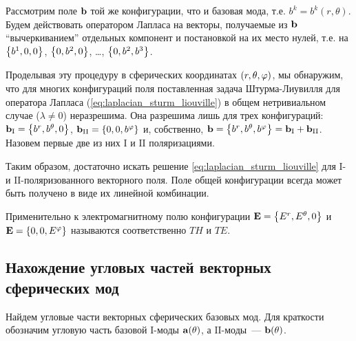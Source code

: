 \documentclass[12pt,a4paper]{article}
\begin{document}
            Рассмотрим поле $\vb{b}$ той же конфигурации, что и базовая мода, т.е. $b^k = b^k(r,\theta)$. Будем действовать оператором Лапласа на векторы, получаемые из $\vb{b}$ \enquote{вычеркиванием} отдельных компонент и постановкой на их место нулей, т.е. на $\qty{ b^1, 0, 0 }$, $\qty{ 0, b^2, 0 }$, \dots, $\qty{ 0, b^2, b^3 }$.

            Проделывая эту процедуру в сферических координатах $\qty(r, \theta, \varphi)$, мы обнаружим, что для многих конфигураций поля поставленная задача Штурма-Лиувилля для оператора Лапласа (\autoref{eq:laplacian_sturm_liouville}) в общем нетривиальном случае ($\lambda \neq 0$) неразрешима. Она разрешима лишь для трех конфигураций: $\vb{b}_{\mathrm{I}} = \qty{ b^r, b^\theta, 0 }$, $\vb{b}_{\mathrm{II}} = \qty{ 0, 0, b^\varphi }$ и, собственно, $\vb{b} = \qty{ b^r, b^\theta, b^\varphi } = \vb{b}_{\mathrm{I}} + \vb{b}_{\mathrm{II}}$. Назовем первые две из них $\mathrm{I}$ и $\mathrm{II}$ поляризациями.

            Таким образом, достаточно искать решение \autoref{eq:laplacian_sturm_liouville} для $\mathrm{I}$- и $\mathrm{II}$-поляризованного векторного поля. Поле общей конфигурации всегда может быть получено в виде их линейной комбинации.

            Применительно к электромагнитному полю конфигурации $\vb{E} = \qty{ E^r, E^\theta, 0 }$ и $\vb{E} = \qty{ 0, 0, E^\varphi }$ называются соответственно\footnotemark{} $TH$ и $TE$.



        \subsection{Нахождение угловых частей векторных сферических мод}

            Найдем угловые части векторных сферических базовых мод. Для краткости обозначим угловую часть базовой $\mathrm{I}$-моды $\vb{a}(\theta)$, а $\mathrm{II}$-моды~--- $\vb{b}(\theta)$.
\end{document}

